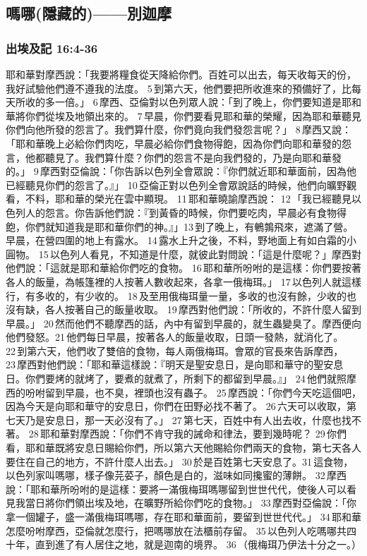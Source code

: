 \subsection{嗎哪(隱藏的)——別迦摩}

\subsubsection{出埃及記 16:4-36}
耶和華對摩西說：「我要將糧食從天降給你們。百姓可以出去，每天收每天的份，我好試驗他們遵不遵我的法度。 5 到第六天，他們要把所收進來的預備好了，比每天所收的多一倍。」 6 摩西、亞倫對以色列眾人說：「到了晚上，你們要知道是耶和華將你們從埃及地領出來的。 7 早晨，你們要看見耶和華的榮耀，因為耶和華聽見你們向他所發的怨言了。我們算什麼，你們竟向我們發怨言呢？」 8 摩西又說：「耶和華晚上必給你們肉吃，早晨必給你們食物得飽，因為你們向耶和華發的怨言，他都聽見了。我們算什麼？你們的怨言不是向我們發的，乃是向耶和華發的。」 9 摩西對亞倫說：「你告訴以色列全會眾說：『你們就近耶和華面前，因為他已經聽見你們的怨言了。』」 10 亞倫正對以色列全會眾說話的時候，他們向曠野觀看，不料，耶和華的榮光在雲中顯現。 11 耶和華曉諭摩西說： 12 「我已經聽見以色列人的怨言。你告訴他們說：『到黃昏的時候，你們要吃肉，早晨必有食物得飽，你們就知道我是耶和華你們的神。』」13 到了晚上，有鵪鶉飛來，遮滿了營。早晨，在營四圍的地上有露水。 14 露水上升之後，不料，野地面上有如白霜的小圓物。 15 以色列人看見，不知道是什麼，就彼此對問說：「這是什麼呢？」摩西對他們說：「這就是耶和華給你們吃的食物。 16 耶和華所吩咐的是這樣：你們要按著各人的飯量，為帳篷裡的人按著人數收起來，各拿一俄梅珥。」 17 以色列人就這樣行，有多收的，有少收的。 18 及至用俄梅珥量一量，多收的也沒有餘，少收的也沒有缺，各人按著自己的飯量收取。 19 摩西對他們說：「所收的，不許什麼人留到早晨。」 20 然而他們不聽摩西的話，內中有留到早晨的，就生蟲變臭了。摩西便向他們發怒。21 他們每日早晨，按著各人的飯量收取，日頭一發熱，就消化了。 22 到第六天，他們收了雙倍的食物，每人兩俄梅珥。會眾的官長來告訴摩西， 23 摩西對他們說：「耶和華這樣說：『明天是聖安息日，是向耶和華守的聖安息日。你們要烤的就烤了，要煮的就煮了，所剩下的都留到早晨。』」 24 他們就照摩西的吩咐留到早晨，也不臭，裡頭也沒有蟲子。 25 摩西說：「你們今天吃這個吧，因為今天是向耶和華守的安息日，你們在田野必找不著了。 26 六天可以收取，第七天乃是安息日，那一天必沒有了。」 27 第七天，百姓中有人出去收，什麼也找不著。 28 耶和華對摩西說：「你們不肯守我的誡命和律法，要到幾時呢？ 29 你們看，耶和華既將安息日賜給你們，所以第六天他賜給你們兩天的食物，第七天各人要住在自己的地方，不許什麼人出去。」 30 於是百姓第七天安息了。31 這食物，以色列家叫嗎哪，樣子像芫荽子，顏色是白的，滋味如同攙蜜的薄餅。 32 摩西說：「耶和華所吩咐的是這樣：要將一滿俄梅珥嗎哪留到世世代代，使後人可以看見我當日將你們領出埃及地，在曠野所給你們吃的食物。」 33 摩西對亞倫說：「你拿一個罐子，盛一滿俄梅珥嗎哪，存在耶和華面前，要留到世世代代。」 34 耶和華怎麼吩咐摩西，亞倫就怎麼行，把嗎哪放在法櫃前存留。 35 以色列人吃嗎哪共四十年，直到進了有人居住之地，就是迦南的境界。 36 （俄梅珥乃伊法十分之一。）

